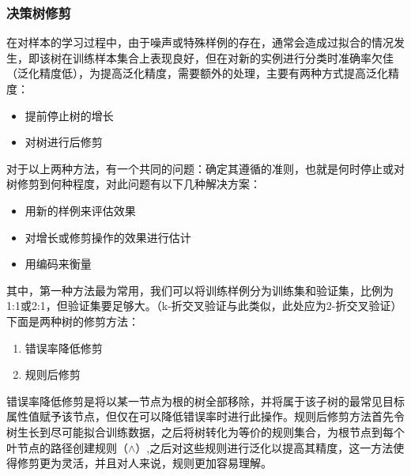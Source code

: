 \documentclass[a4papper]{article}
\begin{document}
\subsubsection{决策树修剪}
在对样本的学习过程中，由于噪声或特殊样例的存在，通常会造成过拟合的情况发生，即该树在训练样本集合上表现良好，但在对新的实例进行分类时准确率欠佳（泛化精度低），为提高泛化精度，需要额外的处理，主要有两种方式提高泛化精度：
\par\setlength{\parindent}{2em} %
\begin{itemize}\setlength{\itemindent}{2em}%
\item 提前停止树的增长
\item 对树进行后修剪
\end{itemize}
\par\setlength{\parindent}{2em} %
对于以上两种方法，有一个共同的问题：确定其遵循的准则，也就是何时停止或对树修剪到何种程度，对此问题有以下几种解决方案：
\begin{itemize}\setlength{\itemindent}{2em}%
\item 用新的样例来评估效果
\item 对增长或修剪操作的效果进行估计
\item 用编码来衡量
\end{itemize}
\par\setlength{\parindent}{2em} %
其中，第一种方法最为常用，我们可以将训练样例分为训练集和验证集，比例为1:1或2:1，但验证集要足够大。（k-折交叉验证与此类似，此处应为2-折交叉验证）下面是两种树的修剪方法：
\begin{enumerate}\setlength{\itemindent}{2em}
  \item 错误率降低修剪
  \item 规则后修剪
\end{enumerate}
\par\setlength{\parindent}{2em} %
错误率降低修剪是将以某一节点为根的树全部移除，并将属于该子树的最常见目标属性值赋予该节点，但仅在可以降低错误率时进行此操作。规则后修剪方法首先令树生长到尽可能拟合训练数据，之后将树转化为等价的规则集合，为根节点到每个叶节点的路径创建规则（$ \wedge $）,之后对这些规则进行泛化以提高其精度，这一方法使得修剪更为灵活，并且对人来说，规则更加容易理解。
\end{document}
